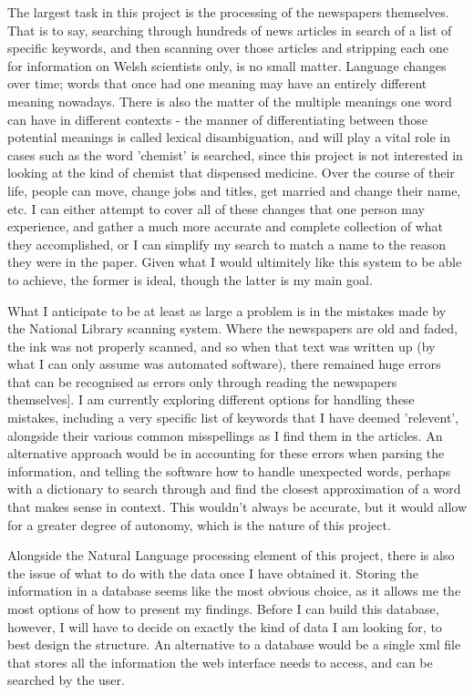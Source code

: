\documentclass{article}
\begin{document}
The largest task in this project is the processing of the newspapers themselves. That is to say, searching through hundreds of news articles in search of a list of specific keywords, and then scanning over those articles and stripping each one for information on Welsh scientists only, is no small matter. Language changes over time; words that once had one meaning may have an entirely different meaning nowadays. There is also the matter of the multiple meanings one word can have in different contexts -  the manner of differentiating between those potential meanings is called lexical disambiguation\cite{disambig}, and will play a vital role in cases such as the word 'chemist' is searched, since this project is not interested in looking at the kind of chemist that dispensed medicine. Over the course of their life, people can move, change jobs and titles, get married and change their name, etc. I can either attempt to cover all of these changes that one person may experience, and gather a much more accurate and complete collection of what they accomplished, or I can simplify my search to match a name to the reason they were in the paper. Given what I would ultimitely like this system to be able to achieve, the former is ideal, though the latter is my main goal. 

What I anticipate to be at least as large a problem is in the mistakes made by the National Library scanning system. Where the newspapers are old and faded, the ink was not properly scanned, and so when that text was written up (by what I can only assume was automated software), there remained huge errors that can be recognised as errors only through reading the newspapers themselves\cite{newspaper1}]. I am currently exploring different options for handling these mistakes, including a very specific list of keywords that I have deemed 'relevent', alongside their various common misspellings as I find them in the articles. An alternative approach would be in accounting for these errors when parsing the information, and telling the software how to handle unexpected words, perhaps with a dictionary to search through and find the closest approximation of a word that makes sense in context. This wouldn't always be accurate, but it would allow for a greater degree of autonomy, which is the nature of this project.

Alongside the Natural Language processing element of this project, there is also the issue of what to do with the data once I have obtained it. Storing the information in a database seems like the most obvious choice, as it allows me the most options of how to present my findings. Before I can build this database, however, I will have to decide on exactly the kind of data I am looking for, to best design the structure. An alternative to a database would be a single xml file that stores all the information the web interface needs to access, and can be searched by the user.
\end{document}
